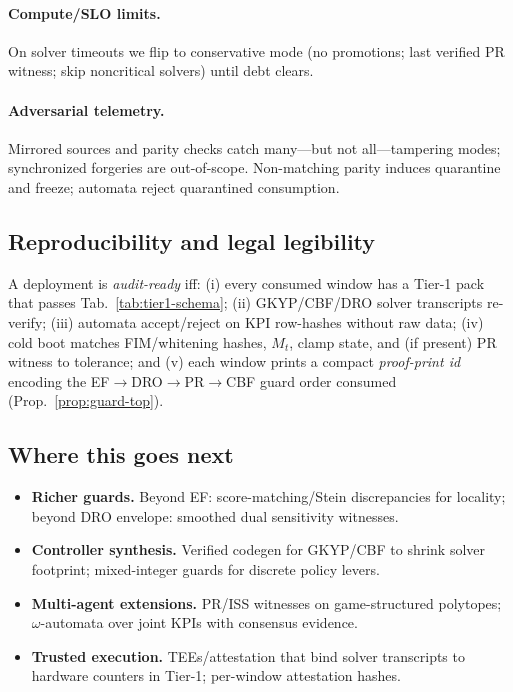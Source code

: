 \paragraph{Compute/SLO limits.}
On solver timeouts we flip to conservative mode (no promotions; last verified PR witness; skip noncritical solvers) until debt clears.

\paragraph{Adversarial telemetry.}
Mirrored sources and parity checks catch many—but not all—tampering modes; synchronized forgeries are out-of-scope. Non-matching parity induces quarantine and freeze; automata reject quarantined consumption.

\subsection{Reproducibility and legal legibility}\label{subsec:repro}
\emph{}

A deployment is \emph{audit-ready} iff: (i) every consumed window has a Tier-1 pack that passes Tab.~\ref{tab:tier1-schema}; (ii) GKYP/CBF/DRO solver transcripts re-verify; (iii) automata accept/reject on KPI row-hashes without raw data; (iv) cold boot matches FIM/whitening hashes, $M_t$, clamp state, and (if present) PR witness to tolerance; and (v) each window prints a compact \emph{proof-print id} encoding the EF$\rightarrow$DRO$\rightarrow$PR$\rightarrow$CBF guard order consumed (Prop.~\ref{prop:guard-top}).

\subsection{Where this goes next}\label{subsec:future}
\emph{}

\begin{itemize}[leftmargin=*]
\item \textbf{Richer guards.} Beyond EF: score-matching/Stein discrepancies for locality; beyond DRO envelope: smoothed dual sensitivity witnesses.
\item \textbf{Controller synthesis.} Verified codegen for GKYP/CBF to shrink solver footprint; mixed-integer guards for discrete policy levers.
\item \textbf{Multi-agent extensions.} PR/ISS witnesses on game-structured polytopes; $\omega$-automata over joint KPIs with consensus evidence.
\item \textbf{Trusted execution.} TEEs/attestation that bind solver transcripts to hardware counters in Tier-1; per-window attestation hashes.
\end{itemize}

